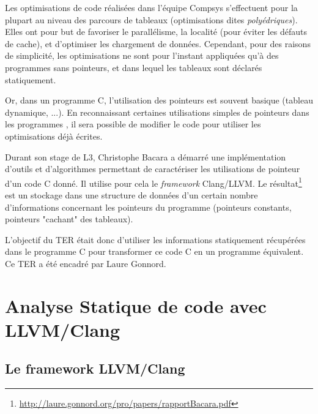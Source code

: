 \documentclass[11pt]{article}
\begin{document}

  Les optimisations de code réalisées dans l'équipe Compsys
  s'effectuent pour la plupart au niveau des parcours de tableaux
  (optimisations dites \emph{polyédriques}). Elles ont pour but de
  favoriser le parallélisme, la localité (pour éviter les défauts
  de cache), et d'optimiser les chargement de données. Cependant,
  pour des raisons de simplicité, les optimisations ne sont pour
  l'instant appliquées qu'à des programmes sans pointeurs, et dans
  lequel les tableaux sont déclarés statiquement.

  Or, dans un programme C, l'utilisation  des pointeurs est
  souvent basique (tableau dynamique, ...). 
  En reconnaissant certaines utilisations simples de pointeurs
  dans les programmes , il sera possible de modifier le code pour
  utiliser les optimisations déjà écrites. 

  
  Durant son stage de L3, Christophe Bacara a démarré une
  implémentation d'outils et d'algorithmes permettant de
  caractériser les utilisations de pointeur d'un 
  code C donné. Il utilise pour cela le \emph{framework} Clang/LLVM.
  Le
  résultat\footnote{\url{http://laure.gonnord.org/pro/papers/rapportBacara.pdf}}
  est un stockage dans une structure de données d'un certain
  nombre d'informations concernant les pointeurs du programme   (pointeurs constants, pointeurs "cachant" des tableaux).
  
 
  L'objectif du TER était donc d'utiliser les informations
  statiquement récupérées dans le programme C pour transformer ce code
  C en un programme équivalent. Ce TER a été encadré par Laure Gonnord.
  
\section{Analyse Statique de code avec LLVM/Clang}

  \subsection{Le framework LLVM/Clang}
  
\end{document}
